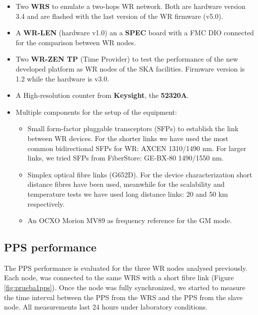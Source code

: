 \begin{itemize}
    \item Two \textbf{WRS} to emulate a two-hops WR network. Both are 
    hardware version 3.4 and are flashed with the last version of the WR 
    firmware (v5.0).
    
    \item A \textbf{WR-LEN} (hardware v1.0) an a \textbf{SPEC} board with a FMC 
    DIO connected for the comparison between WR nodes.
    
    \item Two \textbf{WR-ZEN TP} (Time Provider) to test the 
    performance of the new developed platform as WR nodes of the SKA 
    facilities. Firmware version is 1.2 while the hardware is v3.0.
    
    \item A High-resolution counter from \textbf{Keysight}, the \textbf{52320A}.
    
    \item Multiple components for the setup of the equipment:
    \begin{itemize}
        \item Small form-factor pluggable transceptors (SFPs) to establish the 
        link between WR devices. For the shorter links we have used the most 
        common bidirectional SFPs for WR: AXCEN 1310/1490 nm. For larger links, 
        we tried 
        SFPs from FiberStore: GE-BX-80 1490/1550 nm.
        \item Simplex optical fibre links (G652D). For the device 
        characterization short distance fibres have been used, meanwhile for 
        the scalability and temperature tests we have used long distance links: 
        20 and 50 km respectively.
        \item An OCXO Morion MV89 as frequency reference for the GM mode.
    \end{itemize}
    
\end{itemize}

\subsection{PPS performance}
\label{subsec:pps_performance}

The PPS performance is evaluated for the three WR nodes analysed previously. 
Each node, was connected to the same WRS with a short fibre link (Figure 
\ref{fig:prueba1pps}). Once the node was fully synchronized, we started to 
measure the time interval between the PPS from the WRS and the PPS from the 
slave node. All measurements last 24 hours under laboratory conditions.

